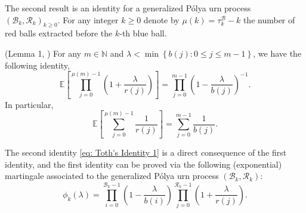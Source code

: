 \documentclass[EJP]{ejpecp} %
\begin{document}
The second result is an identity for a generalized P\'{o}lya urn process $(\mathscr{B}_{k},\mathscr{R}_{k})_{k \ge 0}$. For any integer $k\geq 0$ denote by $\mu(k)= \tau^{\mathscr{B}}_k - k$ the number of red balls extracted before the $k$-th blue ball. 
\begin{lemma}(Lemma 1, \cite{T96}) \label{lm: Toth's Identity}
	For any $m\in \mathbb{N}$ and $\lambda < \min\left\{ b(j): 0\leq j\leq m-1 \right\}$, we have the following identity,
	$$  \mathbb{E}\left[  \prod_{j=0}^{ \mu(m)-1 } \left(1+ \frac{\lambda}{r(j)}   \right) \right] =   \prod_{j=0}^{ m-1 } \left(1- \frac{\lambda}{b(j)}   \right)^{-1}.   $$ 
	In particular, 
	\begin{equation}\label{eq: Toth's Identity 1}
		\mathbb{E}\left[  \sum_{j=0}^{ \mu(m)-1 } \frac{1}{r(j)}   \right] =   \sum_{j=0}^{ m-1 } \frac{1}{b(j)}.
	\end{equation}	
\end{lemma}
The second identity \eqref{eq: Toth's Identity 1} is a direct consequence of the first identity, and the first identity can be proved via the following (exponential) martingale associated to the generalized P\'{o}lya urn process $(\mathscr{B}_{k},\mathscr{R}_{k})$: 
\[
\phi_k(\lambda) = \prod_{i=0}^{ \mathscr{B}_{k}-1 } \left(1-\frac{\lambda}{b(i)}\right) \prod_{j=0}^{\mathscr{R}_{k}-1 } \left(1+\frac{\lambda}{r(j)}\right)
.\]
\end{document}
